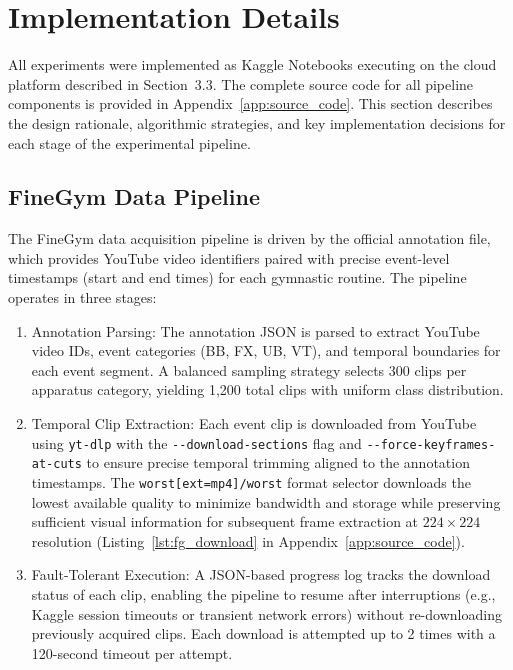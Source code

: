 \section{Implementation Details}

All experiments were implemented as Kaggle Notebooks executing on the cloud platform described in Section~3.3. The complete source code for all pipeline components is provided in Appendix~\ref{app:source_code}. This section describes the design rationale, algorithmic strategies, and key implementation decisions for each stage of the experimental pipeline.

\subsection{FineGym Data Pipeline}

The FineGym data acquisition pipeline is driven by the official annotation file, which provides YouTube video identifiers paired with precise event-level timestamps (start and end times) for each gymnastic routine. The pipeline operates in three stages:

\begin{enumerate}[leftmargin=*]
    \item Annotation Parsing: The annotation JSON is parsed to extract YouTube video IDs, event categories (BB, FX, UB, VT), and temporal boundaries for each event segment. A balanced sampling strategy selects 300 clips per apparatus category, yielding 1,200 total clips with uniform class distribution.
    
    \item Temporal Clip Extraction: Each event clip is downloaded from YouTube using \texttt{yt-dlp} with the \nolinkurl{--download-sections} flag and \nolinkurl{--force-keyframes-at-cuts} to ensure precise temporal trimming aligned to the annotation timestamps. The \nolinkurl{worst[ext=mp4]/worst} format selector downloads the lowest available quality to minimize bandwidth and storage while preserving sufficient visual information for subsequent frame extraction at $224 \times 224$ resolution (Listing~\ref{lst:fg_download} in Appendix~\ref{app:source_code}).
    
    \item Fault-Tolerant Execution: A JSON-based progress log tracks the download status of each clip, enabling the pipeline to resume after interruptions (e.g., Kaggle session timeouts or transient network errors) without re-downloading previously acquired clips. Each download is attempted up to 2 times with a 120-second timeout per attempt.
\end{enumerate}

